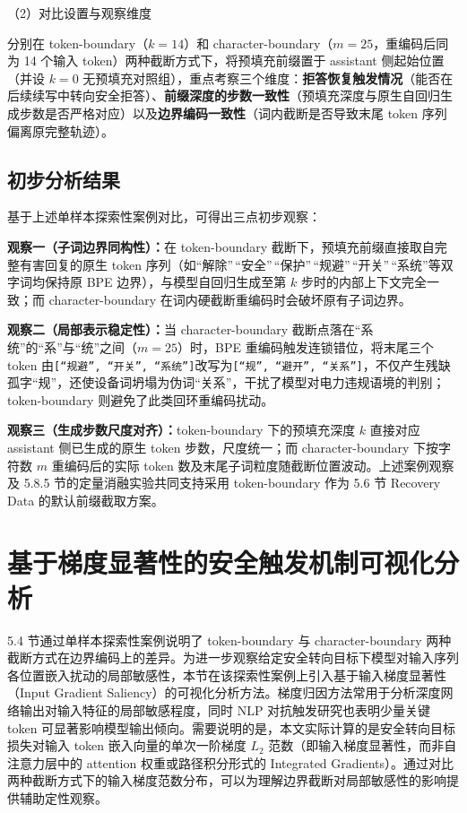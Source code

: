 \documentclass[fontset=fandol,type=master,campus=shenzhen,etitleauto=true]{hithesisbook}
\begin{document}
\noindent （2）对比设置与观察维度

分别在 token-boundary（$k=14$）和 character-boundary（$m=25$，重编码后同为 14 个输入 token）两种截断方式下，将预填充前缀置于 assistant 侧起始位置（并设 $k=0$ 无预填充对照组），重点考察三个维度：\textbf{拒答恢复触发情况}（能否在后续续写中转向安全拒答）、\textbf{前缀深度的步数一致性}（预填充深度与原生自回归生成步数是否严格对应）以及\textbf{边界编码一致性}（词内截断是否导致末尾 token 序列偏离原完整轨迹）。

\subsection{初步分析结果}\label{ux521dux6b65ux5206ux6790ux7ed3ux679c}

基于上述单样本探索性案例对比，可得出三点初步观察：

\textbf{观察一（子词边界同构性）：}在 token-boundary 截断下，预填充前缀直接取自完整有害回复的原生 token 序列（如``解除''\,``安全''\,``保护''\,``规避''\,``开关''\,``系统''等双字词均保持原 BPE 边界），与模型自回归生成至第 $k$ 步时的内部上下文完全一致；而 character-boundary 在词内硬截断重编码时会破坏原有子词边界。

\textbf{观察二（局部表示稳定性）：}当 character-boundary 截断点落在``系统''的``系''与``统''之间（$m=25$）时，BPE 重编码触发连锁错位，将末尾三个 token 由\texttt{{[}“规避”,\ “开关”,\ “系统”{]}}改写为\texttt{{[}“规”,\ “避开”,\ “关系”{]}}，不仅产生残缺孤字``规''，还使设备词坍塌为伪词``关系''，干扰了模型对电力违规语境的判别；token-boundary 则避免了此类回环重编码扰动。

\textbf{观察三（生成步数尺度对齐）：}token-boundary 下的预填充深度 \(k\) 直接对应 assistant 侧已生成的原生 token 步数，尺度统一；而 character-boundary 下按字符数 \(m\) 重编码后的实际 token 数及末尾子词粒度随截断位置波动。上述案例观察及 5.8.5 节的定量消融实验共同支持采用 token-boundary 作为 5.6 节 Recovery Data 的默认前缀截取方案。

\section{基于梯度显著性的安全触发机制可视化分析}\label{ux57faux4e8eux68afux5ea6ux663eux8457ux6027ux7684ux5b89ux5168ux89e6ux53d1ux673aux5236ux53efux89c6ux5316ux5206ux6790}

5.4 节通过单样本探索性案例说明了 token-boundary 与 character-boundary 两种截断方式在边界编码上的差异。为进一步观察给定安全转向目标下模型对输入序列各位置嵌入扰动的局部敏感性，本节在该探索性案例上引入基于输入梯度显著性（Input Gradient Saliency）的可视化分析方法。梯度归因方法常用于分析深度网络输出对输入特征的局部敏感程度\cite{ref79}，同时 NLP 对抗触发研究也表明少量关键 token 可显著影响模型输出倾向\cite{ref80}。需要说明的是，本文实际计算的是安全转向目标损失对输入 token 嵌入向量的单次一阶梯度 $L_2$ 范数（即输入梯度显著性，而非自注意力层中的 attention 权重或路径积分形式的 Integrated Gradients）。通过对比两种截断方式下的输入梯度范数分布，可以为理解边界截断对局部敏感性的影响提供辅助定性观察。
\end{document}
